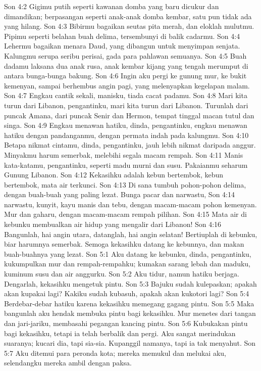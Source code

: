 Son 4:2  Gigimu putih seperti kawanan domba yang baru dicukur dan dimandikan; berpasangan seperti anak-anak domba kembar, satu pun tidak ada yang hilang.
Son 4:3  Bibirmu bagaikan seutas pita merah, dan eloklah mulutmu. Pipimu seperti belahan buah delima, tersembunyi di balik cadarmu.
Son 4:4  Lehermu bagaikan menara Daud, yang dibangun untuk menyimpan senjata. Kalungmu serupa seribu perisai, gada para pahlawan semuanya.
Son 4:5  Buah dadamu laksana dua anak rusa, anak kembar kijang yang tengah merumput di antara bunga-bunga bakung.
Son 4:6  Ingin aku pergi ke gunung mur, ke bukit kemenyan, sampai berhembus angin pagi, yang melenyapkan kegelapan malam.
Son 4:7  Engkau cantik sekali, manisku, tiada cacat padamu.
Son 4:8  Mari kita turun dari Libanon, pengantinku, mari kita turun dari Libanon. Turunlah dari puncak Amana, dari puncak Senir dan Hermon, tempat tinggal macan tutul dan singa.
Son 4:9  Engkau menawan hatiku, dinda, pengantinku, engkau menawan hatiku dengan pandanganmu, dengan permata indah pada kalungmu.
Son 4:10  Betapa nikmat cintamu, dinda, pengantinku, jauh lebih nikmat daripada anggur. Minyakmu harum semerbak, melebihi segala macam rempah.
Son 4:11  Manis kata-katamu, pengantinku, seperti madu murni dan susu. Pakaianmu seharum Gunung Libanon.
Son 4:12  Kekasihku adalah kebun bertembok, kebun bertembok, mata air terkunci.
Son 4:13  Di sana tumbuh pohon-pohon delima, dengan buah-buah yang paling lezat. Bunga pacar dan narwastu,
Son 4:14  narwastu, kunyit, kayu manis dan tebu, dengan macam-macam pohon kemenyan. Mur dan gaharu, dengan macam-macam rempah pilihan.
Son 4:15  Mata air di kebunku membualkan air hidup yang mengalir dari Libanon!
Son 4:16  Bangunlah, hai angin utara, datanglah, hai angin selatan! Bertiuplah di kebunku, biar harumnya semerbak. Semoga kekasihku datang ke kebunnya, dan makan buah-buahnya yang lezat.
Son 5:1  Aku datang ke kebunku, dinda, pengantinku, kukumpulkan mur dan rempah-rempahku; kumakan sarang lebah dan maduku, kuminum susu dan air anggurku.
Son 5:2  Aku tidur, namun hatiku berjaga. Dengarlah, kekasihku mengetuk pintu.
Son 5:3  Bajuku sudah kulepaskan; apakah akan kupakai lagi? Kakiku sudah kubasuh, apakah akan kukotori lagi?
Son 5:4  Berdebar-debar hatiku karena kekasihku memegang gagang pintu.
Son 5:5  Maka bangunlah aku hendak membuka pintu bagi kekasihku. Mur menetes dari tangan dan jari-jariku, membasahi pegangan kancing pintu.
Son 5:6  Kubukakan pintu bagi kekasihku, tetapi ia telah berbalik dan pergi. Aku sangat merindukan suaranya; kucari dia, tapi sia-sia. Kupanggil namanya, tapi ia tak menyahut.
Son 5:7  Aku ditemui para peronda kota; mereka memukul dan melukai aku, selendangku mereka ambil dengan paksa.
